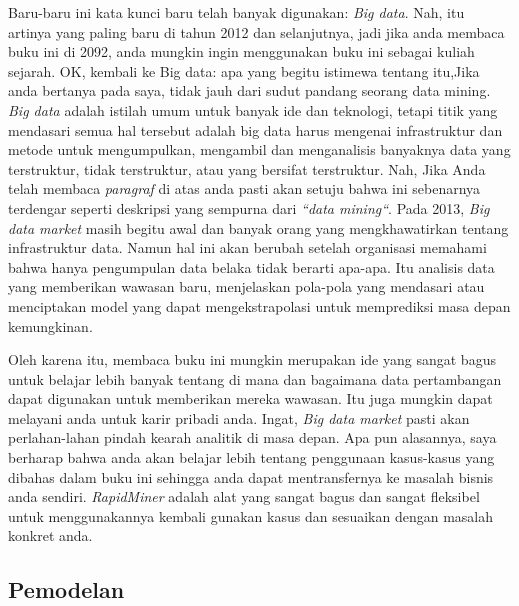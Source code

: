   \par Baru-baru ini kata kunci baru telah banyak digunakan: \textit{Big data}. Nah, itu artinya yang paling baru di tahun 2012 dan selanjutnya, jadi jika anda membaca buku ini di 2092, anda mungkin ingin menggunakan buku ini sebagai kuliah sejarah. OK, kembali ke Big data: apa yang begitu istimewa tentang itu,Jika anda bertanya pada saya, tidak jauh dari sudut pandang seorang data mining. \textit{Big data} adalah istilah umum untuk banyak ide dan teknologi, tetapi titik yang mendasari semua hal tersebut adalah big data harus mengenai infrastruktur dan metode untuk mengumpulkan, mengambil dan menganalisis banyaknya data yang terstruktur, tidak terstruktur, atau yang bersifat terstruktur. Nah, Jika Anda telah membaca \textit{paragraf }di atas anda pasti akan setuju bahwa ini sebenarnya terdengar seperti deskripsi yang sempurna dari \textit{“data mining“}. Pada 2013, \textit{Big data market }masih begitu awal dan banyak orang yang mengkhawatirkan tentang infrastruktur data. Namun hal ini akan berubah setelah organisasi memahami bahwa hanya pengumpulan data belaka tidak berarti apa-apa. Itu analisis data yang memberikan wawasan baru, menjelaskan pola-pola yang mendasari atau menciptakan model yang dapat mengekstrapolasi untuk memprediksi masa depan kemungkinan.
   
   \par  Oleh karena itu, membaca buku ini mungkin merupakan ide yang sangat bagus untuk belajar lebih banyak tentang di mana dan bagaimana data pertambangan dapat digunakan untuk memberikan mereka wawasan. Itu juga mungkin dapat melayani anda untuk karir pribadi anda. Ingat, \textit{Big data market} pasti akan perlahan-lahan pindah kearah analitik di masa depan. Apa pun alasannya, saya berharap bahwa anda akan belajar lebih tentang penggunaan kasus-kasus yang dibahas dalam buku ini sehingga anda dapat mentransfernya ke masalah bisnis anda sendiri. \textit{RapidMiner} adalah alat yang sangat bagus dan sangat fleksibel untuk menggunakannya kembali gunakan kasus dan sesuaikan dengan masalah konkret anda. 

\subsection{Pemodelan}

